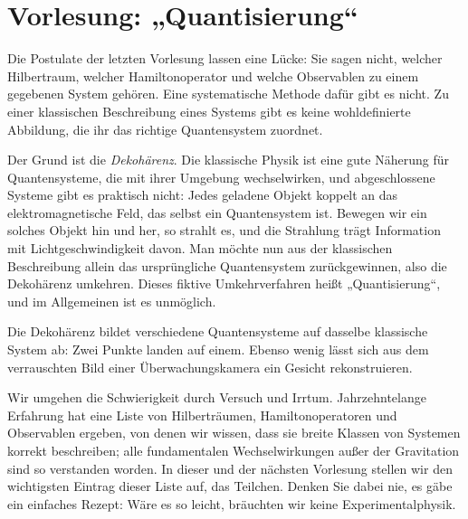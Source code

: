 \section{Vorlesung: „Quantisierung“}
Die Postulate der letzten Vorlesung lassen eine Lücke: Sie sagen nicht, welcher Hilbertraum, welcher Hamiltonoperator und welche Observablen zu einem gegebenen System gehören. Eine systematische Methode dafür gibt es nicht. Zu einer klassischen Beschreibung eines Systems gibt es keine wohldefinierte Abbildung, die ihr das richtige Quantensystem zuordnet.

Der Grund ist die \emph{Dekohärenz}. Die klassische Physik ist eine gute Näherung für Quantensysteme, die mit ihrer Umgebung wechselwirken, und abgeschlossene Systeme gibt es praktisch nicht: Jedes geladene Objekt koppelt an das elektromagnetische Feld, das selbst ein Quantensystem ist. Bewegen wir ein solches Objekt hin und her, so strahlt es, und die Strahlung trägt Information mit Lichtgeschwindigkeit davon. Man möchte nun aus der klassischen Beschreibung allein das ursprüngliche Quantensystem zurückgewinnen, also die Dekohärenz umkehren. Dieses fiktive Umkehrverfahren heißt „Quantisierung“, und im Allgemeinen ist es unmöglich.

\begin{greybox}
	Die Dekohärenz bildet verschiedene Quantensysteme auf dasselbe klassische System ab: Zwei Punkte landen auf einem. Ebenso wenig lässt sich aus dem verrauschten Bild einer Überwachungskamera ein Gesicht rekonstruieren.
\end{greybox}

Wir umgehen die Schwierigkeit durch Versuch und Irrtum. Jahrzehntelange Erfahrung hat eine Liste von Hilberträumen, Hamiltonoperatoren und Observablen ergeben, von denen wir wissen, dass sie breite Klassen von Systemen korrekt beschreiben; alle fundamentalen Wechselwirkungen außer der Gravitation sind so verstanden worden. In dieser und der nächsten Vorlesung stellen wir den wichtigsten Eintrag dieser Liste auf, das Teilchen. Denken Sie dabei nie, es gäbe ein einfaches Rezept: Wäre es so leicht, bräuchten wir keine Experimentalphysik.

